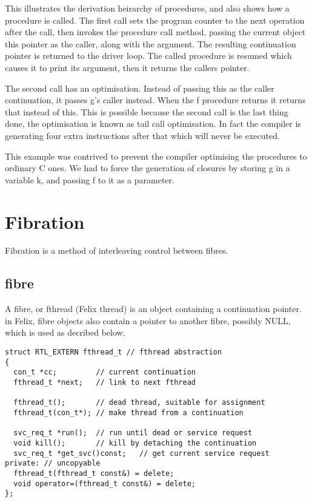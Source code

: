 \documentclass[oneside]{book}
\begin{document}
This illustrates the derivation heirarchy of procedures, and also 
shows how a procedure is called. The first call sets the program
counter to the next operation after the call, then invokes the procedure
call method, passing the current object this pointer as the caller,
along with the argument. The resulting continuation pointer is returned
to the driver loop. The called procedure is resumed which causes it
to print its argument, then it returns the callers pointer.

The second call has an optimisation. Instead of passing this as the
caller continuation, it passes g's caller instead. When the f
procedure returns it returns that instead of this. This is possible
because the second call is the last thing done, the optimisation
is known as tail call optimisation. In fact the compiler is generating
four extra instructions after that which will never be executed.

This example was contrived to prevent the compiler optimising
the procedures to ordinary C ones. We had to force the generation
of closures by storing g in a variable k, and passing f to it
as a parameter.

\section{Fibration}
Fibration is a method of interleaving control between fibres.

\subsection{fibre}
A fibre, or fthread (Felix thread) is an object containing a continuation pointer.
in Felix, fibre objects also contain a pointer to another fibre, possibly NULL,
which is used as decribed below.

\begin{verbatim}
struct RTL_EXTERN fthread_t // fthread abstraction
{
  con_t *cc;         // current continuation
  fthread_t *next;   // link to next fthread

  fthread_t();       // dead thread, suitable for assignment
  fthread_t(con_t*); // make thread from a continuation

  svc_req_t *run();  // run until dead or service request
  void kill();       // kill by detaching the continuation
  svc_req_t *get_svc()const;   // get current service request
private: // uncopyable
  fthread_t(fthread_t const&) = delete;
  void operator=(fthread_t const&) = delete;
};
\end{verbatim}
\end{document}
